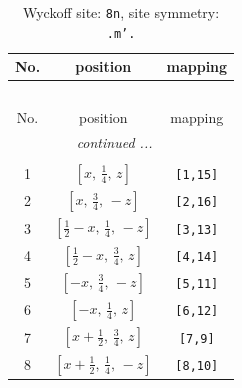 \documentclass[fleqn,8pt]{jsarticle}
\begin{document}
\begin{longtable}{ccc}
\caption{Wyckoff site: {\tt 8n}, site symmetry: {\tt .m'.}}
 \\
 \hline \hline
No. & position & mapping \\ \hline \endfirsthead

\multicolumn{2}{l}{\tablename\ \thetable{}} \\
 \hline \hline
No. & position & mapping \\ \hline \endhead

 \hline \hline
\multicolumn{2}{r}{\footnotesize\it continued ...} \\ \endfoot

 \hline \hline
\multicolumn{2}{r}{} \\ \endlastfoot

1 & $\left[ x,\, \frac{1}{4},\, z \right]$ & {\tt [1,15]} \\ \hline
2 & $\left[ x,\, \frac{3}{4},\, - z \right]$ & {\tt [2,16]} \\ \hline
3 & $\left[ \frac{1}{2} - x,\, \frac{1}{4},\, - z \right]$ & {\tt [3,13]} \\ \hline
4 & $\left[ \frac{1}{2} - x,\, \frac{3}{4},\, z \right]$ & {\tt [4,14]} \\ \hline
5 & $\left[ - x,\, \frac{3}{4},\, - z \right]$ & {\tt [5,11]} \\ \hline
6 & $\left[ - x,\, \frac{1}{4},\, z \right]$ & {\tt [6,12]} \\ \hline
7 & $\left[ x + \frac{1}{2},\, \frac{3}{4},\, z \right]$ & {\tt [7,9]} \\ \hline
8 & $\left[ x + \frac{1}{2},\, \frac{1}{4},\, - z \right]$ & {\tt [8,10]} \\
\end{longtable}
\renewcommand{\arraystretch}{1.2}
\end{document}
